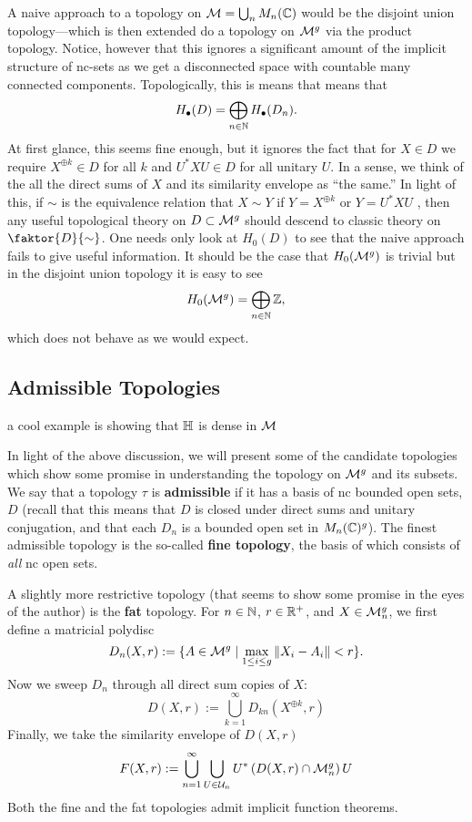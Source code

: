 A naive approach to a topology on \(\mathcal{M} = \bigcup_n M_n(\mathbb{C})\) would be the
disjoint union topology---which is then extended do a topology on \(\mathcal{M}^g\) via
the product topology. Notice, however that this ignores a significant amount of
the implicit structure of nc-sets as we get a disconnected space with countable
many connected components. Topologically, this is means that means that
\[
  H_\bullet (D) = \bigoplus_{n \in \mathbb{N} } H_\bullet(D_n).
\]
At first glance, this seems fine enough, but it ignores the fact that for
\(X \in D\) we require \(X^{\oplus k} \in D\) for all \(k\) and \(U^*XU \in D\)
for all unitary \(U\). In a sense, we think of the all the direct sums of \(X\)
and its similarity envelope as ``the same.'' In light of this, if \(\sim\) is
the equivalence relation that \(X\sim Y\) if \(Y = X^{\oplus k}\) or
\(Y = U^*XU\) ,
then any useful topological theory on \(D \subset \mathcal{M}^g\) should descend to
classic theory on \(\faktor{D}{\sim}\). One needs only look at \(H_0(D)\) to see
that the naive approach fails to give useful information. It should be the case
that \(H_0(\mathcal{M}^{g} )\) is trivial but in the disjoint union topology it is easy
to see
\[
  H_0(\mathcal{M}^{g} ) = \bigoplus_{n \in \mathbb{N} } \mathbb{Z} ,
\]
which does not behave as we would expect.


\subsection{Admissible Topologies}%
\label{sec:admtopo}

{\color{blue} a cool example is showing that \(\mathbb{H} \) is dense in \(\mathcal{M}\)}

In light of the above discussion, we will present some of the candidate
topologies which show some promise in understanding the topology on \(\mathcal{M}^g\)
and its subsets.
We say that a topology \(\tau\) is \textbf{admissible} if it has a basis of nc
bounded open sets, \(D\) (recall that this means that \(D\) is closed under
direct sums and unitary conjugation, and that each \(D_n\) is a bounded open set
in \(M_n(\mathbb{C})^g\)). The finest admissible topology is the so-called \textbf{fine
  topology},
the basis of which consists of \emph{all} nc open sets.

A slightly more restrictive topology (that seems to show some promise in the eyes
of the author) is the \textbf{fat} topology. For \(n \in \mathbb{N} \),
\(r \in \mathbb{R} ^+\), and \(X \in \mathcal{M}^g_n\), we first define a matricial polydisc
\[
  D_n(X,r) := \{A \in \mathcal{M}^g \mid \max_{1\leq i\leq g} \| X_i-A_i \| <r\}.
\]
Now we sweep \(D_n\) through all direct sum copies of \(X\):
\[
  D(X,r) := \bigcup_{k=1}^\infty D_{kn} (X^{\oplus k},r)
\]
Finally, we take the similarity envelope of \(D(X,r)\)
\[
  F(X,r) :=  \bigcup_{n=1}^\infty \bigcup_{U \in \mathcal{U}_n} U^* \left( D(X,r) \cap \mathcal{M}^g_n \right) U
\]
Both the fine and the fat topologies admit implicit function theorems.

